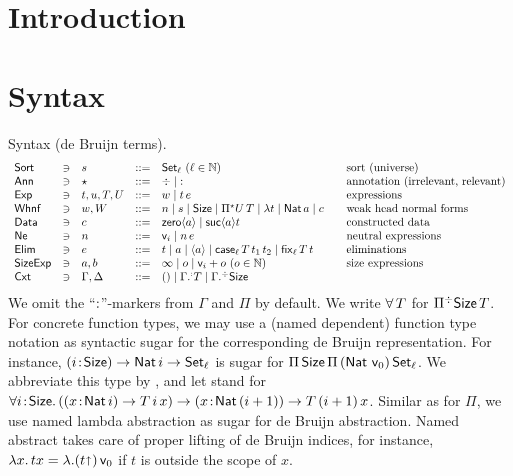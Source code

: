 \documentclass[acmlarge,review,anonymous]{acmart}\settopmatter{printfolios=true}
\begin{document}
\section{Introduction}
\label{sec:intro}

\newpage

\section{Syntax}

Syntax (de Bruijn terms).
\[
\begin{array}{lllrl@{\qquad}l}
\Sort & \ni & s
    & ::= & \Set[\ell] ~(\ell \in \NN)& \mbox{sort (universe)} \\
\Ann & \ni & \star & ::= & \erased \mid \noterased & \mbox{annotation (irrelevant, relevant)}\\
\Exp & \ni & t,u,T,U
    & ::= & w \mid t\,e & \mbox{expressions} \\
\Whnf & \ni & w, W
    & ::= & n \mid s \mid \Size \mid \epiT U T %
    \mid \lambda t%
    \mid \Nat a \mid c & \mbox{weak head normal forms} \\ %
\Data & \ni & c
   & ::= & \zero a \mid \suc a t & \mbox{constructed data} \\
\Ne & \ni & n
    & ::= & \ind i \mid n \, e & \mbox{neutral expressions} \\
\Elim & \ni & e
    & ::= & t \mid a \mid \ann a \mid \case[\ell] T {t_1} t_2 \mid \fix[\ell] T t & \mbox{eliminations} \\
\SizeExp & \ni & a,b & ::= & \infty \mid o \mid \ind i + o ~(o \in \NN) & \mbox{size expressions} \\
\Cxt & \ni & \Gamma, \Delta & ::= & \cempty \mid \erext[\noterased] \Gamma T \mid \erext \Gamma \Size \\
\end{array}
\]
We omit the ``$\noterased$''-markers from $\Gamma$ and $\Pi$ by default.  We write $\forallT T$ for $\erpiT \Size T$.
For concrete function types, we may use a (named dependent) function type notation as syntactic sugar for the corresponding de Bruijn representation.  For instance, $\funT i \Size \Nat i \to \Set[\ell]$ is sugar for $\piT \Size \piT {(\Nat\,\ind 0)} \Set[\ell]$.  We abbreviate this type by \fbox{$\FixK\,\ell$}, and let  stand for $\allT i \Size (\funT x {\Nat i} T\, i\, x) \to \funT x {\Nat (i + 1)} T \,(i+1)\, x$. Similar as for $\Pi$, we use named lambda abstraction as sugar for de Bruijn abstraction.  Named abstract takes care of proper lifting of de Bruijn indices, for instance, $\lambda x.\, t x = \lambda. (t \slift)\,\ind 0$ if $t$ is outside the scope of $x$.
\end{document}
